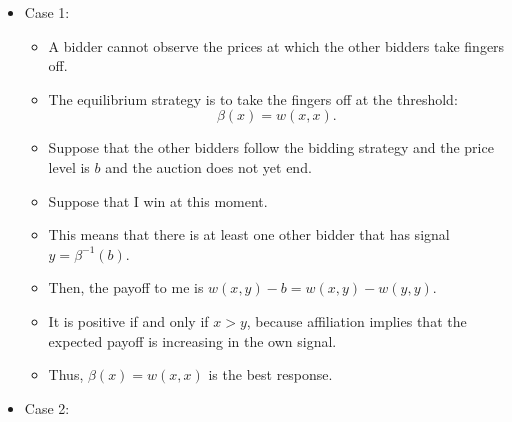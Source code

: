 \documentclass[
]{book}
\providecommand{\tightlist}{%
  \setlength{\itemsep}{0pt}\setlength{\parskip}{0pt}}
\begin{document}
\begin{itemize}
\tightlist
\item
  Case 1:

  \begin{itemize}
  \tightlist
  \item
    A bidder cannot observe the prices at which the other bidders take fingers off.
  \item
    The equilibrium strategy is to take the fingers off at the threshold:
    \[
      \beta(x) = w(x, x).
      \]
  \item
    Suppose that the other bidders follow the bidding strategy and the price level is \(b\) and the auction does not yet end.
  \item
    Suppose that I win at this moment.
  \item
    This means that there is at least one other bidder that has signal \(y = \beta^{-1}(b)\).
  \item
    Then, the payoff to me is \(w(x, y) - b = w(x, y) - w(y, y)\).
  \item
    It is positive if and only if \(x > y\), because affiliation implies that the expected payoff is increasing in the own signal.
  \item
    Thus, \(\beta(x) = w(x, x)\) is the best response.
  \end{itemize}
\item
  Case 2:


\end{itemize}
\end{document}
